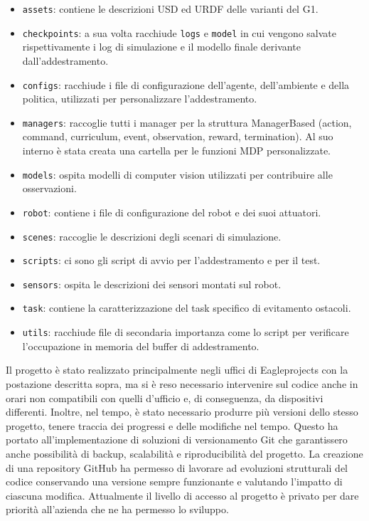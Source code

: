 \begin{itemize}
    \item \texttt{assets}: contiene le descrizioni USD ed URDF delle varianti del G1.
    \item \texttt{checkpoints}: a sua volta racchiude \texttt{logs} e \texttt{model} in cui vengono salvate rispettivamente i log di simulazione e il modello finale derivante dall'addestramento.
    \item \texttt{configs}: racchiude i file di configurazione dell'agente, dell'ambiente e della politica, utilizzati per personalizzare l'addestramento.
    \item \texttt{managers}: raccoglie tutti i manager per la struttura ManagerBased (action, command, curriculum, event, observation, reward, termination). Al suo interno è stata creata una cartella per le funzioni MDP personalizzate.
    \item \texttt{models}: ospita modelli di computer vision utilizzati per contribuire alle osservazioni.
    \item \texttt{robot}: contiene i file di configurazione del robot e dei suoi attuatori.
    \item \texttt{scenes}: raccoglie le descrizioni degli scenari di simulazione.
    \item \texttt{scripts}: ci sono gli script di avvio per l'addestramento e per il test.
    \item \texttt{sensors}: ospita le descrizioni dei sensori montati sul robot.
    \item \texttt{task}: contiene la caratterizzazione del task specifico di evitamento ostacoli.
    \item \texttt{utils}: racchiude file di secondaria importanza come lo script per verificare l'occupazione in memoria del buffer di addestramento.
\end{itemize}

Il progetto è stato realizzato principalmente negli uffici di Eagleprojects con la postazione descritta sopra, ma si è reso necessario intervenire sul codice anche in orari non compatibili con quelli d'ufficio e, di conseguenza, da dispositivi differenti. Inoltre, nel tempo, è stato necessario produrre più versioni dello stesso progetto, tenere traccia dei progressi e delle modifiche nel tempo. Questo ha portato all'implementazione di soluzioni di versionamento Git che garantissero anche possibilità di backup, scalabilità e riproducibilità del progetto. La creazione di una repository GitHub ha permesso di lavorare ad evoluzioni strutturali del codice conservando una versione sempre funzionante e valutando l'impatto di ciascuna modifica. Attualmente il livello di accesso al progetto è privato per dare priorità all'azienda che ne ha permesso lo sviluppo.


